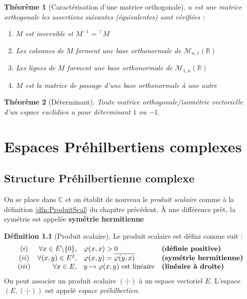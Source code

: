 \documentclass[11pt,a4paper]{report}
\newtheorem{theorem}{Théorème}[chapter]
\newtheorem{itheorem}[theorem]{Théorème}
\theoremstyle{definition}
\newtheorem{dfn}[theorem]{Définition}
\begin{document}
\begin{itheorem}[Caractérisation d'une matrice orthogonale]
    $u$ est une matrice orthogonale \Longleftrightarrow les assertions suivantes (équivalentes) sont vérifiées :
    \renewcommand{\theenumi}{\roman{enumi}}%
    \begin{enumerate}
        \item $M$ est inversible et $M^{-1} = {}^{\intercal}M$
        \item Les colonnes de $M$ forment une base orthonormale de $\mathcal{M}_{n,1}(\ensuremath{\mathbb{R}} )$
        \item Les lignes de $M$ forment une base orthonormale de $\mathcal{M}_{1,n}(\ensuremath{\mathbb{R}} )$
        \item $M$ est la matrice de passage d'une base orthonormale à une autre
    \end{enumerate}
\end{itheorem}
\begin{theorem}[Déterminant]
     Toute matrice orthogonale/isométrie vectorielle d'un espace euclidien a pour déterminant $1$ ou $-1$.
\end{theorem}

\chapter{Espaces Préhilbertiens complexes}
\section{Structure Préhilbertienne complexe}
On se place dans $\ensuremath{\mathbb{C}}$ et on établit de nouveau le \emph{produit scalaire} comme à la définition \ref{dfn:ProduitScal} du chapitre précédent. À une différence prêt, la symétrie est appelée \textbf{symétrie hermitienne}
\begin{dfn}[Produit scalaire]\label{dfn:ProduitScalCmplx}
Le produit scalaire  est défini comme suit : 
\[
\begin{array}{c r l l}
(i)&\forall x \in E\backslash \{ 0 \} , &{\varphi(x,x)>0}&\text{\textbf{(définie positive)}}\\
(ii)&\forall (x,y) \in E^2, &{\varphi (x,y) = \overline {\varphi (y,x)}} &\text{\textbf{(symétrie hermitienne)}}\\
(iii)&\forall x \in E, &{y \mapsto \varphi(x,y) \text{ est linéaire}}&\text{\textbf{(linéaire à droite)}}
\end{array}
\]
On peut associer un produit scalaire $(\cdot | \cdot )$ à un espace vectoriel $E$. L'espace $\left( E, (\cdot | \cdot ) \right)
$ est appelé \emph{espace préhilbertien}.
\end{dfn}
\end{document}
